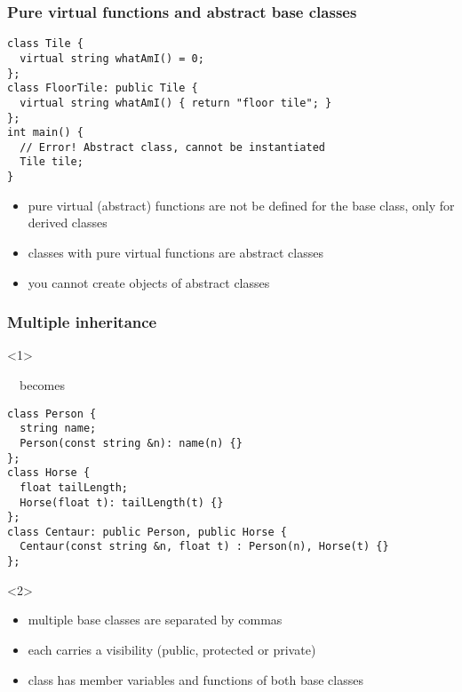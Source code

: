 \documentclass{slides}
\begin{document}
\begin{frame}[fragile]
  \frametitle{Pure virtual functions and abstract base classes}

\begin{lstlisting}
class Tile {
  virtual string whatAmI() = 0;
};
class FloorTile: public Tile {
  virtual string whatAmI() { return "floor tile"; }
};
int main() {
  // Error! Abstract class, cannot be instantiated
  Tile tile;
}
\end{lstlisting}

    \begin{itemize}
    \item pure virtual (abstract) functions are not be defined for the
      base class, only for derived classes
    \item classes with pure virtual functions are \alert{abstract}
      classes
    \item you cannot create objects of abstract classes
    \end{itemize}
\end{frame}

\begin{frame}[fragile]
  \frametitle{Multiple inheritance}
  
  \begin{onlyenv}<1>
    ~~becomes
  \end{onlyenv}

\begin{lstlisting}[emph={public}]
class Person {
  string name;
  Person(const string &n): name(n) {}
};
class Horse {
  float tailLength;
  Horse(float t): tailLength(t) {}
};
class Centaur: public Person, public Horse {
  Centaur(const string &n, float t) : Person(n), Horse(t) {}
};
\end{lstlisting}

  \begin{onlyenv}<2>
    \begin{itemize}
    \item multiple base classes are separated by commas
    \item each carries a visibility (public, protected or private)
    \item class has member variables and functions of both base
      classes
    \end{itemize}
  \end{onlyenv}
\end{frame}
\end{document}
